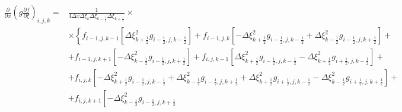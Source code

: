 \documentclass[12pt, a4paper]{article}
\newcommand\onehalf{\frac{1}{2}} %
\begin{document}
\begin{equation*}
    \begin{split}
        \
        \left.
            \frac
                {\partial}
                {\partial x}
            \left(
                g
                \frac
                    {\partial f}
                    {\partial \xi}
            \right)
        \right._{i, j, k}
        = &
        \frac
            {1}
            {
                4
                \Delta x
                \Delta \xi_{k}
                \Delta \xi_{k - \onehalf}
                \Delta \xi_{k + \onehalf}
            }
        \times
        \\ &
        \times
        \left\{
            f_{i - 1, j, k - 1}
            \left[
                \Delta \xi^2_{k + \onehalf}
                g_{i - \onehalf, j, k - \onehalf}
            \right]
            +
            f_{i - 1, j, k}
            \left[
                -\Delta \xi^2_{k + \onehalf}
                g_{i - \onehalf, j, k - \onehalf}
                +
                \Delta \xi^2_{k - \onehalf}
                g_{i - \onehalf, j, k + \onehalf}
            \right]
            +
        \right.
        \\ &
        \left.
            +
            f_{i - 1, j, k + 1}
            \left[
                - \Delta \xi^2_{k - \onehalf}
                g_{i - \onehalf, j, k + \onehalf}
            \right]
            +
            f_{i, j, k - 1}
            \left[
                \Delta \xi^2_{k + \onehalf}
                g_{i - \onehalf, j, k - \onehalf}
                -
                \Delta \xi^2_{k + \onehalf}
                g_{i + \onehalf, j, k - \onehalf}
            \right]
            +
        \right.
        \\ &
        \left.
            +
            f_{i, j, k}
            \left[
                -
                \Delta \xi^2_{k + \onehalf}
                g_{i - \onehalf, j, k - \onehalf}
                +
                \Delta \xi^2_{k - \onehalf}
                g_{i - \onehalf, j, k + \onehalf}
                +
                \Delta \xi^2_{k + \onehalf}
                g_{i + \onehalf, j, k - \onehalf}
                -
                \Delta \xi^2_{k - \onehalf}
                g_{i + \onehalf, j, k + \onehalf}
            \right]
            +
        \right.
        \\ &
        \left.
            +
            f_{i, j, k + 1}
            \left[
                -
                \Delta \xi^2_{k - \onehalf}
                g_{i - \onehalf, j, k + \onehalf}

\end{split}
\end{equation*}
\end{document}
